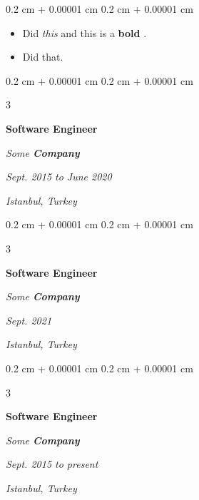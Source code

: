 \documentclass[10pt, letterpaper]{article}
\newenvironment{highlights}{
    \begin{itemize}[
        topsep=0.10 cm,
        parsep=0.10 cm,
        partopsep=0pt,
        itemsep=0pt,
        leftmargin=0.4 cm + 10pt + 0.6 cm
    ]
}{
    \end{itemize}
} %
\newenvironment{onecolentry}{
    \begin{adjustwidth}{
        0.2 cm + 0.00001 cm
    }{
        0.2 cm + 0.00001 cm
    }
}{
    \end{adjustwidth}
} %
\newenvironment{threecolentry}[3][]{
    \onecolentry
    \def\thirdColumn{#3}
    \setcolumnwidth{0.6 cm, \fill, 4.5 cm}
    \begin{paracol}{3}
    #2 \switchcolumn
}{
    \switchcolumn \raggedleft \thirdColumn
    \end{paracol}
    \endonecolentry
} %
\let\hrefWithoutArrow\href
\renewcommand{\href}[2]{\hrefWithoutArrow{#1}{\mbox{\ifthenelse{\equal{#2}{}}{ }{#2 }\raisebox{.15ex}{\footnotesize \faExternalLink*}}}}
\begin{document}
        \vspace{0.10 cm}
        \begin{onecolentry}
            \begin{highlights}
                \item Did \textit{this} and this is a \textbf{bold} \href{https://example.com}{link}.
                \item Did that.
            \end{highlights}
        \end{onecolentry}


        \vspace{0.2 cm}

        \begin{threecolentry}{
            \vspace*{\fill}
            \textbullet
            \vspace*{3px}
            \vspace*{\fill}
        }{
        \textit{Sept. 2015 to June 2020}
            
        \textit{Istanbul, Turkey}}
            \textbf{Software Engineer}
            
            \textit{Some \textbf{Company}}
        \end{threecolentry}



        \vspace{0.2 cm}

        \begin{threecolentry}{
            \vspace*{\fill}
            \textbullet
            \vspace*{3px}
            \vspace*{\fill}
        }{
        \textit{Sept. 2021}
            
        \textit{Istanbul, Turkey}}
            \textbf{Software Engineer}
            
            \textit{Some \textbf{Company}}
        \end{threecolentry}



        \vspace{0.2 cm}

        \begin{threecolentry}{
            \vspace*{\fill}
            \textbullet
            \vspace*{3px}
            \vspace*{\fill}
        }{
        \textit{Sept. 2015 to present}
            
        \textit{Istanbul, Turkey}}
            \textbf{Software Engineer}
            
            \textit{Some \textbf{Company}}
        \end{threecolentry}
\end{document}
